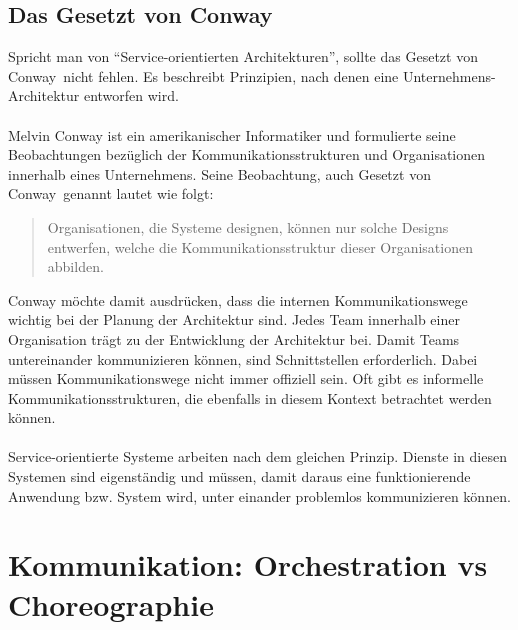 \subsection{Das Gesetzt von Conway}
\label{subsec:conway}
Spricht man von "`Service-orientierten Architekturen"', sollte das \glqq Gesetzt von Conway\grqq\ nicht fehlen. Es beschreibt Prinzipien, nach denen eine Unternehmens-Architektur entworfen wird.
\\\\
Melvin Conway ist ein amerikanischer Informatiker und formulierte seine Beobachtungen bezüglich der Kommunikationsstrukturen und Organisationen innerhalb eines Unternehmens. Seine Beobachtung, auch \glqq Gesetzt von Conway\grqq\ genannt lautet wie folgt:
\begin{quotation}
    \frqq Organisationen, die Systeme designen, können nur solche Designs entwerfen, welche die Kommunikationsstruktur dieser Organisationen abbilden.\flqq\ \cite[S. 39]{EWolff2016:Microservices}
\end{quotation}

Conway möchte damit ausdrücken, dass die internen Kommunikationswege wichtig bei der Planung der Architektur sind. Jedes Team innerhalb einer Organisation trägt zu der Entwicklung der Architektur bei. Damit Teams untereinander kommunizieren können, sind Schnittstellen erforderlich. Dabei müssen Kommunikationswege nicht immer offiziell sein. Oft gibt es informelle Kommunikationsstrukturen, die ebenfalls in diesem Kontext betrachtet werden können.
\\\\
Service-orientierte Systeme arbeiten nach dem gleichen Prinzip. Dienste in diesen Systemen sind eigenständig und müssen, damit daraus eine funktionierende Anwendung bzw. System wird, unter einander problemlos kommunizieren können.

\section{Kommunikation: Orchestration vs Choreographie}
\label{sec:OrchestrationVsChoregraphie}

